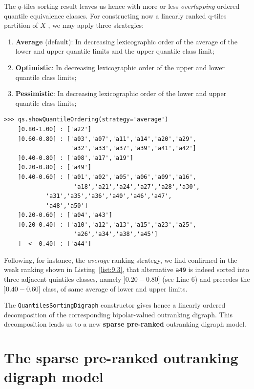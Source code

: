 The $q$-tiles sorting result leaves us hence with more or less \emph{overlapping} ordered quantile equivalence classes. For constructing now a linearly ranked q-tiles partition of $X$ , we may apply three strategies:
\begin{enumerate}[leftmargin=0.5cm,rightmargin=0.5cm]
\item \textbf{Average} (default): In decreasing lexicographic order of the average of the lower and upper quantile limits and the upper quantile class limit;
\item \textbf{Optimistic}: In decreasing lexicographic order of the upper and lower quantile class limits;
\item \textbf{Pessimistic}: In decreasing lexicographic order of the lower and upper quantile class limits;
\end{enumerate}

\begin{lstlisting}[caption={Weakly ranking the quintiles sorting result},label=list:9.3]
>>> qs.showQuantileOrdering(strategy='average')
    ]0.80-1.00] : ['a22']
    ]0.60-0.80] : ['a03','a07','a11','a14','a20','a29',
                   'a32','a33','a37','a39','a41','a42']
    ]0.40-0.80] : ['a08','a17','a19']
    ]0.20-0.80] : ['a49']
    ]0.40-0.60] : ['a01','a02','a05','a06','a09','a16',
                    'a18','a21','a24','a27','a28','a30',
		    'a31','a35','a36','a40','a46','a47',
		    'a48','a50']
    ]0.20-0.60] : ['a04','a43']
    ]0.20-0.40] : ['a10','a12','a13','a15','a23','a25',
                    'a26','a34','a38','a45']
    ]  < -0.40] : ['a44']
\end{lstlisting}
Following, for instance, the \emph{average} ranking strategy, we find confirmed in the weak ranking shown in Listing~\vref{list:9.3},  that alternative \texttt{a49}  is indeed sorted into three adjacent quintiles classes, namely $]0.20-0.80]$ (see Line 6) and precedes the $]0.40-0.60]$ class, of same average of lower and upper limits.

The \texttt{QuantilesSortingDigraph} constructor gives hence a linearly ordered decomposition of the corresponding bipolar-valued outranking digraph. This decomposition leads us to a new \textbf{sparse pre-ranked} outranking digraph model.

\section{The sparse pre-ranked outranking digraph model}
\label{sec:9.3}

